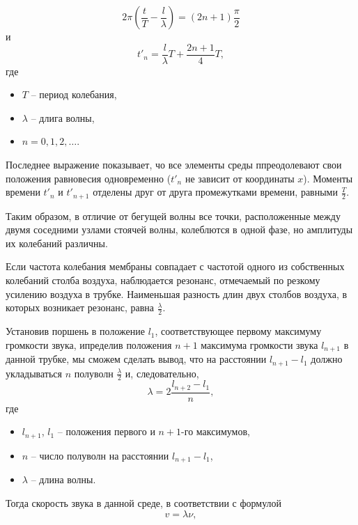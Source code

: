 \documentclass[referat,times]{SCWorks}
\begin{document}
\begin{equation}
    2\pi(\frac t T - \frac l \lambda) = (2n + 1) \frac \pi 2
\end{equation}
и
\begin{equation}
    t'_n = \frac l \lambda T + \frac{2n+1}{4} T,
\end{equation}
где
\begin{itemize}
    \item $T$ -- период колебания,
    \item $\lambda$ -- длига волны,
    \item $n = 0, 1, 2, \dots$.
\end{itemize}
\par Последнее выражение показывает, чо все элементы среды ппреодолевают свои положения равновесия одновременно ($t'_n$ не зависит от координаты $x$). Моменты времени $t'_n$ и $t'_{n+1}$ отделены друг от друга промежутками времени, равными $\frac T 2$.
\par Таким образом, в отличие от бегущей волны все точки, расположенные между двумя соседними узлами стоячей волны, колеблются в одной фазе, но амплитуды их колебаний различны.
\par Если частота колебания мембраны совпадает с частотой одного из собственных колебаний столба воздуха, наблюдается резонанс, отмечаемый по резкому усилению воздуха в трубке. Наименьшая разность длин двух столбов воздуха, в которых возникает резонанс, равна $\frac \lambda 2$.
\par Установив поршень в положение $l_1$, соответствующее первому максимуму громкости звука, ипределив положения $n+1$ максимума громкости звука $l_{n+1}$ в данной трубке, мы сможем сделать вывод, что на расстоянии $l_{n+1} - l_1$ должно укладываться $n$ полуволн $\frac \lambda 2$ и, следовательно,
\begin{equation}
    \lambda = 2 \frac{l_{n+2} - l_1}{n},
\end{equation}
где
\begin{itemize}
    \item $l_{n+1}$, $l_1$ -- положения первого и $n+1$-го максимумов,
    \item $n$ -- число полуволн на расстоянии $l_{n+1} - l_1$,
    \item $\lambda$ -- длина волны.
\end{itemize}
\par Тогда скорость звука в данной среде, в соответствии с формулой
\begin{equation*}
    v = \lambda \nu,
\end{equation*}
\end{document}
